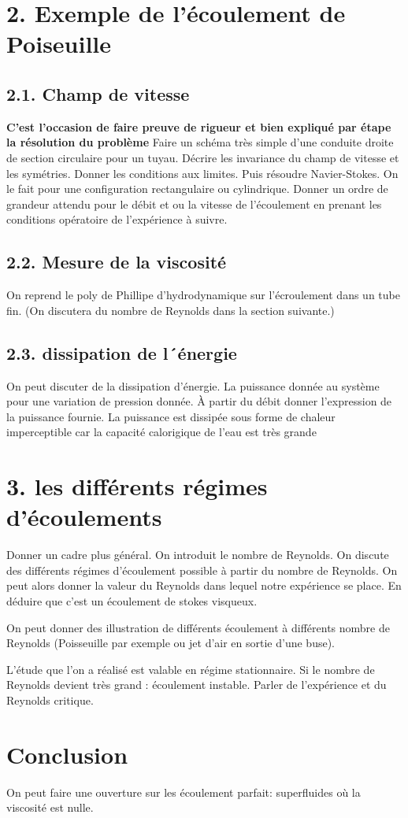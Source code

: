 \documentclass[french, a4paper, 10pt, twocolumn, landscape]{article}
\begin{document}
\section*{2. Exemple de l'écoulement de Poiseuille}
\subsection*{2.1. Champ de vitesse}
\textbf{C'est l'occasion de faire preuve de rigueur et bien expliqué par étape la résolution du problème}
Faire un schéma très simple d'une conduite droite de section circulaire pour un tuyau. Décrire les invariance du champ de vitesse et les symétries. Donner les conditions aux limites. Puis résoudre Navier-Stokes. On le fait pour une configuration rectangulaire ou cylindrique. Donner un ordre de grandeur attendu pour le débit et ou la vitesse de l'écoulement en prenant les conditions opératoire de l'expérience à suivre.

\subsection*{2.2. Mesure de la viscosité}

On reprend le poly de Phillipe d'hydrodynamique sur l'écroulement dans un tube fin. (On discutera du nombre de Reynolds dans la section suivante.)

\subsection*{2.3. dissipation de l´énergie}

On peut discuter de la dissipation d'énergie. La puissance donnée au système pour une variation de pression donnée. À partir du débit donner l'expression de la puissance fournie. La puissance est dissipée sous forme de chaleur imperceptible car la capacité calorigique de l'eau est très grande

\section*{3. les différents régimes d'écoulements}

Donner un cadre plus général. On introduit le nombre de Reynolds. On discute des différents régimes d'écoulement possible à partir du nombre de Reynolds. On peut alors donner la valeur du Reynolds dans lequel notre expérience se place. En déduire que c'est un écoulement de stokes visqueux.\medskip

On peut donner des illustration de différents écoulement à différents nombre de Reynolds (Poisseuille par exemple ou jet d'air en sortie d'une buse).

L'étude que l'on a réalisé est valable en régime stationnaire. Si le nombre de Reynolds devient très grand : écoulement instable. Parler de l'expérience et du Reynolds critique.

\section*{Conclusion}

On peut faire une ouverture sur les écoulement parfait: superfluides où la viscosité est nulle. 
\end{document}
